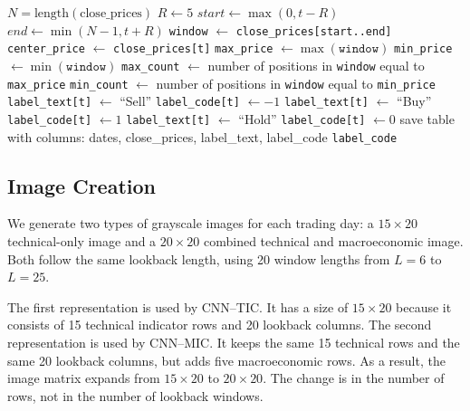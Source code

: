 \begin{algorithm}[H]
	\caption{Turning point label generation (Buy, Hold, Sell)}
	\label{alg:labelgen-turningpoint}
	\begin{algorithmic}[1]
		\State $N = \text{length}(\text{close\_prices})$  
		\State $R \gets 5$ 
		\State $start \gets \max(0, t - R)$
		\State $end \gets \min(N - 1, t + R)$
		\State \texttt{window} $\gets$ \texttt{close\_prices[start..end]}
		\State \texttt{center\_price} $\gets$ \texttt{close\_prices[t]}
		\State \texttt{max\_price} $\gets \max(\texttt{window})$
		\State \texttt{min\_price} $\gets \min(\texttt{window})$
		\State \texttt{max\_count} $\gets$ number of positions in \texttt{window} equal to \texttt{max\_price}
		\State \texttt{min\_count} $\gets$ number of positions in \texttt{window} equal to \texttt{min\_price}
		\State \texttt{label\_text[t]} $\gets$ ``Sell''
		\State \texttt{label\_code[t]} $\gets -1$
		\State \texttt{label\_text[t]} $\gets$ ``Buy''
		\State \texttt{label\_code[t]} $\gets 1$
		\Else
		\State \texttt{label\_text[t]} $\gets$ ``Hold''
		\State \texttt{label\_code[t]} $\gets 0$
		\EndIf
		\EndFor
		\State save table with columns: dates, close\_prices, label\_text, label\_code
		\State \Return \texttt{label\_code}
		\EndProcedure
	\end{algorithmic}
\end{algorithm}


\subsection{Image Creation} \label{subsec:image-creation}
We generate two types of grayscale images for each trading day: a $15 \times 20$ technical-only image and a $20 \times 20$ combined technical and macroeconomic image. Both follow the same lookback length, using 20 window lengths from $L = 6$ to $L = 25$.

The first representation is used by CNN--TIC. 
It has a size of $15 \times 20$ because it consists of 15 technical indicator rows and 20 lookback columns. 
The second representation is used by CNN--MIC. 
It keeps the same 15 technical rows and the same 20 lookback columns, but adds five macroeconomic rows. 
As a result, the image matrix expands from $15 \times 20$ to $20 \times 20$. 
The change is in the number of rows, not in the number of lookback windows.

